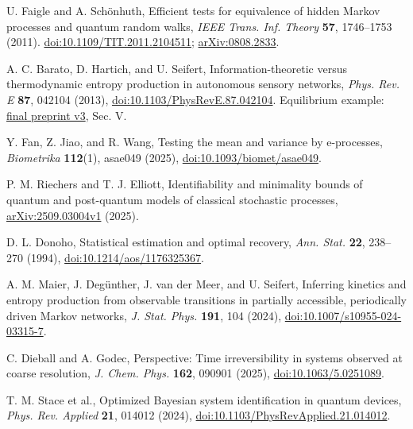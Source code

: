  U. Faigle and A. Sch\"onhuth, Efficient tests for equivalence of hidden Markov processes and quantum random walks, \emph{IEEE Trans. Inf. Theory} \textbf{57}, 1746--1753 (2011). \href{https://doi.org/10.1109/TIT.2011.2104511}{doi:10.1109/TIT.2011.2104511}; \href{https://arxiv.org/abs/0808.2833}{arXiv:0808.2833}.

 A. C. Barato, D. Hartich, and U. Seifert, Information-theoretic versus thermodynamic entropy production in autonomous sensory networks, \emph{Phys. Rev. E} \textbf{87}, 042104 (2013), \href{https://doi.org/10.1103/PhysRevE.87.042104}{doi:10.1103/PhysRevE.87.042104}. Equilibrium example: \href{https://arxiv.org/html/1212.3186v3}{final preprint v3}, Sec. V.

 Y. Fan, Z. Jiao, and R. Wang, Testing the mean and variance by e-processes, \emph{Biometrika} \textbf{112}(1), asae049 (2025), \href{https://doi.org/10.1093/biomet/asae049}{doi:10.1093/biomet/asae049}.

 P. M. Riechers and T. J. Elliott, Identifiability and minimality bounds of quantum and post-quantum models of classical stochastic processes, \href{https://arxiv.org/abs/2509.03004v1}{arXiv:2509.03004v1} (2025).

 D. L. Donoho, Statistical estimation and optimal recovery, \emph{Ann. Stat.} \textbf{22}, 238--270 (1994), \href{https://doi.org/10.1214/aos/1176325367}{doi:10.1214/aos/1176325367}.

 A. M. Maier, J. Deg\"unther, J. van der Meer, and U. Seifert, Inferring kinetics and entropy production from observable transitions in partially accessible, periodically driven Markov networks, \emph{J. Stat. Phys.} \textbf{191}, 104 (2024), \href{https://doi.org/10.1007/s10955-024-03315-7}{doi:10.1007/s10955-024-03315-7}.

 C. Dieball and A. Godec, Perspective: Time irreversibility in systems observed at coarse resolution, \emph{J. Chem. Phys.} \textbf{162}, 090901 (2025), \href{https://doi.org/10.1063/5.0251089}{doi:10.1063/5.0251089}.

 T. M. Stace et al., Optimized Bayesian system identification in quantum devices, \emph{Phys. Rev. Applied} \textbf{21}, 014012 (2024), \href{https://doi.org/10.1103/PhysRevApplied.21.014012}{doi:10.1103/PhysRevApplied.21.014012}.
